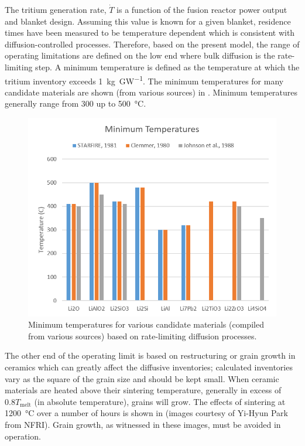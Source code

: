 \documentclass[11pt]{report} %
\begin{document}
The tritium generation rate, $\dot{T}$ is a function of the fusion reactor power output and blanket design. Assuming this value is known for a given blanket, residence times have been measured to be temperature dependent which is consistent with diffusion-controlled processes. Therefore, based on the present model, the range of operating limitations are defined on the low end where bulk diffusion is the rate-limiting step. A minimum temperature is defined as the temperature at which the tritium inventory exceeds \SI{1}{\kilo\gram\per\giga\watt}. The minimum temperatures for many candidate materials are shown (from various sources) in . Minimum temperatures generally range from 300 up to \SI{500}{\celsius}.

\begin{figure}[ht]
	\centering
	\includegraphics[width=\textwidth]{images/Tmin} 
	\caption{Minimum temperatures for various candidate materials (compiled from various sources) based on rate-limiting diffusion processes.}
	\label{fig:Tmin}
\end{figure}

The other end of the operating limit is based on restructuring or grain growth in ceramics which can greatly affect the diffusive inventories; calculated inventories vary as the square of the grain size and should be kept small. When ceramic materials are heated above their sintering temperature, generally in excess of $0.8 T_\text{melt}$ (in absolute temperature), grains will grow. The effects of sintering at \SI{1200}{\celsius} over a number of hours is shown in  (images courtesy of Yi-Hyun Park from NFRI). Grain growth, as witnessed in these images, must be avoided in operation.
\end{document}
